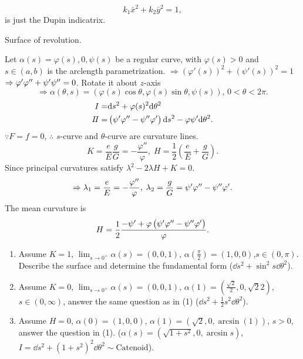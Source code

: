 \[k_1 \bar{x}^2+k_2\bar{y}^2=1,\]
is just the Dupin indicatrix.
\begin{exercise}
    Surface of revolution.
\end{exercise}
Let \(\alpha(s)=\varphi(s),0,\psi(s)\) be a regular curve, with \(\varphi
(s)>0\) and \(s\in(a,b)\) is the arclength parametrization.
\(\Rightarrow \left(\varphi'(s)\right)^2+\left(\psi'(s)\right)^2=1\)
\(\Rightarrow \varphi'\varphi'' +\psi'\psi''=0\).
Rotate it about \(z\)-axis
\[
    \Rightarrow \alpha(\theta,s)=\left(\varphi(s)\cos\theta
    ,\varphi(s)\sin \theta,\psi(s)\right),\, 0<\theta<2\pi.
\]
\begin{align*}
    I=&\dd s^2+\varphi(s)^2\dd \theta^2\\
    I\!I=&\left(\psi'\varphi''-\psi''\varphi'\right)\dd s^2
    -\varphi\psi'\dd\theta^2.
\end{align*}
\(\because F=f=0\), \(\therefore\) \(s\)-curve and \(\theta\)-curve 
are curvature lines.
\[
    K=\frac{e}{E}\frac{g}{G}=-\frac{\varphi''}{\varphi},\;
    H=\frac{1}{2}\left(\frac{e}{E}+\frac{g}{G}\right)    .
\]
Since principal curvatures satisfy \(\lambda^2-2\lambda H+K=0\).
\[
    \Rightarrow \lambda_1    =\frac{e}{E}=-\frac{\varphi''}{\varphi},
    \;\lambda_2=\frac{g}{G}=\psi'\varphi''-\psi''\varphi'.
\]
The mean curvature is 
\[
    H=\frac{1}{2}\frac{-\psi'+\varphi\left(\psi'\varphi''-
    \psi''\varphi'\right)}{\varphi}.    
\]
\begin{question}[Homework]
    \begin{enumerate}[(1)]
        \item Assume \(K=1\), \(\lim_{s\to 0^+}\alpha(s)=(0,0,1)\),
         \(\alpha(\frac{\pi}{2})=(1,0,0)\),\(s\in (0,\pi)\). 
         Describe the surface and determine the 
         fundamental form (\(\dd s^2+\sin^2 s\dd \theta^2\)).
         \item Assume \(K=0\), \(\lim_{s\to 0^+}\alpha(s)=(0,0,1)\),
          \(\alpha(1)=(\frac{\sqrt{2}}{2},0,\sqrt{2}{2})\), 
          \(s\in (0,\infty)\), answer the same question as in (1)
          (\(\dd s^2+\frac{1}{2}s^2\dd \theta^2\)).
          \item Assume \(H=0\), \(\alpha(0)=(1,0,0)\), \(\alpha(1)
          =(\sqrt{2},0,\arcsin(1))\), \(s>0\), answer the question in 
          (1). (\(\alpha(s)=\left(\sqrt{1+s^2},0,\arcsin s\right)\),
           \(I=\dd s^2+(1+s^2)^2\dd \theta^2\sim \text{Catenoid}\)).
    \end{enumerate}
\end{question}


